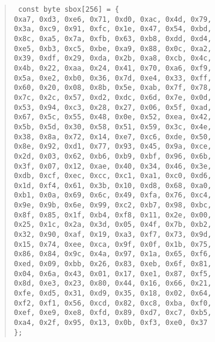 \documentclass{llncs}
\begin{document}
\begin{verse} \tt
const byte sbox[256] = \{ \\
    0xa7, 0xd3, 0xe6, 0x71, 0xd0, 0xac, 0x4d, 0x79,\\
    0x3a, 0xc9, 0x91, 0xfc, 0x1e, 0x47, 0x54, 0xbd,\\
    0x8c, 0xa5, 0x7a, 0xfb, 0x63, 0xb8, 0xdd, 0xd4,\\
    0xe5, 0xb3, 0xc5, 0xbe, 0xa9, 0x88, 0x0c, 0xa2,\\
    0x39, 0xdf, 0x29, 0xda, 0x2b, 0xa8, 0xcb, 0x4c,\\
    0x4b, 0x22, 0xaa, 0x24, 0x41, 0x70, 0xa6, 0xf9,\\
    0x5a, 0xe2, 0xb0, 0x36, 0x7d, 0xe4, 0x33, 0xff,\\
    0x60, 0x20, 0x08, 0x8b, 0x5e, 0xab, 0x7f, 0x78,\\
    0x7c, 0x2c, 0x57, 0xd2, 0xdc, 0x6d, 0x7e, 0x0d,\\
    0x53, 0x94, 0xc3, 0x28, 0x27, 0x06, 0x5f, 0xad,\\
    0x67, 0x5c, 0x55, 0x48, 0x0e, 0x52, 0xea, 0x42,\\
    0x5b, 0x5d, 0x30, 0x58, 0x51, 0x59, 0x3c, 0x4e,\\
    0x38, 0x8a, 0x72, 0x14, 0xe7, 0xc6, 0xde, 0x50,\\
    0x8e, 0x92, 0xd1, 0x77, 0x93, 0x45, 0x9a, 0xce,\\
    0x2d, 0x03, 0x62, 0xb6, 0xb9, 0xbf, 0x96, 0x6b,\\
    0x3f, 0x07, 0x12, 0xae, 0x40, 0x34, 0x46, 0x3e,\\
    0xdb, 0xcf, 0xec, 0xcc, 0xc1, 0xa1, 0xc0, 0xd6,\\
    0x1d, 0xf4, 0x61, 0x3b, 0x10, 0xd8, 0x68, 0xa0,\\
    0xb1, 0x0a, 0x69, 0x6c, 0x49, 0xfa, 0x76, 0xc4,\\
    0x9e, 0x9b, 0x6e, 0x99, 0xc2, 0xb7, 0x98, 0xbc,\\
    0x8f, 0x85, 0x1f, 0xb4, 0xf8, 0x11, 0x2e, 0x00,\\
    0x25, 0x1c, 0x2a, 0x3d, 0x05, 0x4f, 0x7b, 0xb2,\\
    0x32, 0x90, 0xaf, 0x19, 0xa3, 0xf7, 0x73, 0x9d,\\
    0x15, 0x74, 0xee, 0xca, 0x9f, 0x0f, 0x1b, 0x75,\\
    0x86, 0x84, 0x9c, 0x4a, 0x97, 0x1a, 0x65, 0xf6,\\
    0xed, 0x09, 0xbb, 0x26, 0x83, 0xeb, 0x6f, 0x81,\\
    0x04, 0x6a, 0x43, 0x01, 0x17, 0xe1, 0x87, 0xf5,\\
    0x8d, 0xe3, 0x23, 0x80, 0x44, 0x16, 0x66, 0x21,\\
    0xfe, 0xd5, 0x31, 0xd9, 0x35, 0x18, 0x02, 0x64,\\
    0xf2, 0xf1, 0x56, 0xcd, 0x82, 0xc8, 0xba, 0xf0,\\
    0xef, 0xe9, 0xe8, 0xfd, 0x89, 0xd7, 0xc7, 0xb5,\\
    0xa4, 0x2f, 0x95, 0x13, 0x0b, 0xf3, 0xe0, 0x37 \\
\};
\end{verse}
\end{document}
